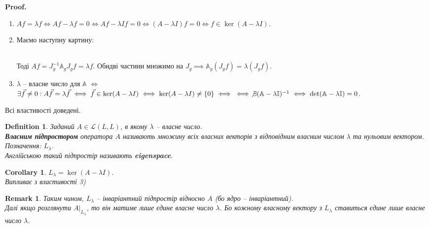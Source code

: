 \documentclass[a4paper, 10pt]{article}
\makeatletter
\theoremstyle{theoremdd}
\newtheorem{definition}[theorem]{Definition}
\newtheorem{remark}[theorem]{Remark}
\newtheorem{corollary}[theorem]{Corollary}
\renewenvironment{proof}[1][Proof.\\]{\par
\pushQED{\hfill \qed}%
\normalfont \topsep6\p@\@plus6\p@\relax
\trivlist
\item\relax
{\bfseries
#1\@addpunct{.}}\hspace\labelsep\ignorespaces
}{%
\popQED\endtrivlist\@endpefalse
}
\makeatother
\begin{document}
\begin{proof}
\begin{enumerate}[wide=0pt, label={\arabic*)},topsep=-\parskip]
\item $Af = \lambda f \iff Af - \lambda f = 0 \iff Af - \lambda If = 0 \iff (A-\lambda I)f = 0 \iff f \in \ker(A - \lambda I)$.

\item Маємо наступну картину:\\
\\
Тоді $Af = J_g^{-1} \mathbb{A}_g J_g f = \lambda f$. Обидві частини множимо на $J_g \implies \mathbb{A}_g (J_g f) = \lambda (J_g f)$.

\item $\lambda$ -- власне число для $\mathbb{A}$ $\iff$ $\exists \vec{f} \neq 0: A \vec{f} = \lambda \vec{f} \iff \vec{f} \in \ker (A-\lambda I) \iff \ker (A-\lambda I) \neq \{0\} \iff \\ \iff \not\exists (\mathbb{A} - \lambda \mathbb{I})^{-1} \iff \det (\mathbb{A} - \lambda \mathbb{I}) = 0$.
\end{enumerate}
Всі властивості доведені.
\end{proof}

\begin{definition}
Заданий $A \in \mathcal{L}(L,L)$, в якому $\lambda$ -- власне число.\\
\textbf{Власним підпростором} оператора $A$ називають множину всіх власних векторів з відповідним власним числом $\lambda$ та нульовим вектором.\\
Позначення: $L_{\lambda}$. \\
Англійською такий підпростір називають \textbf{eigenspace}.
\end{definition}

\begin{corollary}
$L_\lambda = \ker(A-\lambda I)$.\\
\textit{Випливає з властивості 3)}
\end{corollary}

\begin{remark}
Таким чином, $L_{\lambda}$ -- інваріантний підпростір відносно $A$ (бо ядро -- інваріантний). \\
Далі якщо розглянути $A|_{L_{\lambda}}$, то він матиме лише єдине власне число $\lambda$. Бо кожному власному вектору з $L_{\lambda}$ ставиться єдине лише власне число $\lambda$.
\end{remark}
\end{document}
